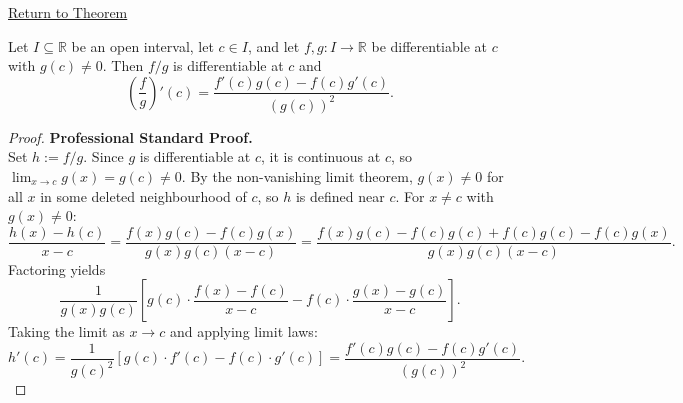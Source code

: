 \newpage
{}
\label{prf:quotient-rule}

\begin{remark*}[Return]
\hyperref[thm:quotient-rule]{Return to Theorem}
\end{remark*}

\begin{theorem*}
Let $I \subseteq \mathbb{R}$ be an open interval, let $c \in I$, and let
$f, g : I \to \mathbb{R}$ be differentiable at $c$ with $g(c) \neq 0$. Then
$f/g$ is differentiable at $c$ and
\[
  \left(\frac{f}{g}\right)'(c) = \frac{f'(c)g(c) - f(c)g'(c)}{(g(c))^2}.
\]
\end{theorem*}

\begin{proof}
\textbf{Professional Standard Proof.}~\\
Set $h := f/g$. Since $g$ is differentiable at $c$, it is continuous at $c$, so $\lim_{x \to c} g(x) = g(c) \neq 0$. By the non-vanishing limit theorem, $g(x) \neq 0$ for all $x$ in some deleted neighbourhood of $c$, so $h$ is defined near $c$. For $x \neq c$ with $g(x) \neq 0$:
\[
  \frac{h(x) - h(c)}{x - c}
  = \frac{f(x)g(c) - f(c)g(x)}{g(x)g(c)(x - c)}
  = \frac{f(x)g(c) - f(c)g(c) + f(c)g(c) - f(c)g(x)}{g(x)g(c)(x - c)}.
\]
Factoring yields
\[
  \frac{1}{g(x)g(c)}
    \left[
      g(c) \cdot \frac{f(x) - f(c)}{x - c}
      - f(c) \cdot \frac{g(x) - g(c)}{x - c}
    \right].
\]
Taking the limit as $x \to c$ and applying limit laws:
\[
  h'(c) = \frac{1}{g(c)^2}[g(c) \cdot f'(c) - f(c) \cdot g'(c)] = \frac{f'(c)g(c) - f(c)g'(c)}{(g(c))^2}.
\]
\end{proof}

